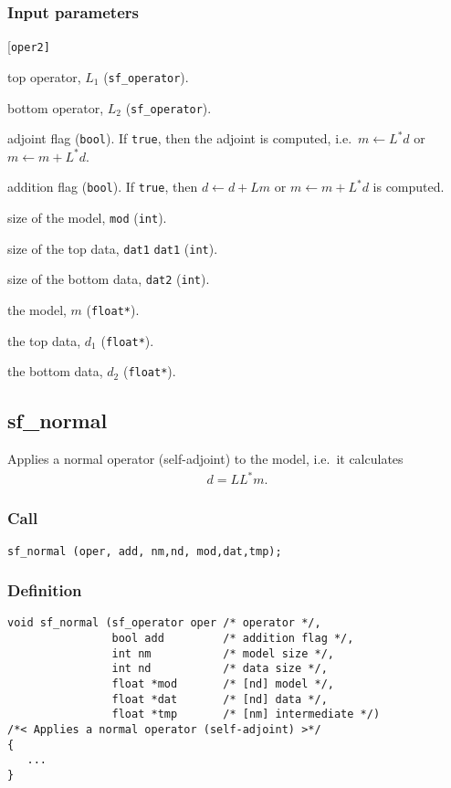\subsubsection*{Input parameters}
\begin{desclist}{\tt }{\quad}[\tt oper2]
   \setlength\itemsep{0pt}
   \item[oper1] top operator, $L_1$ (\texttt{sf\_operator}). 
   \item[oper2] bottom operator, $L_2$ (\texttt{sf\_operator}). 
   \item[adj]   adjoint flag (\texttt{bool}). If \texttt{true}, then the adjoint is computed, i.e.~$m\leftarrow L^*d$ or $m\leftarrow m + L^*d$. 
   \item[add] addition flag (\texttt{bool}). If \texttt{true}, then $d\leftarrow d + Lm$ or $m\leftarrow m + L^*d$ is computed.  
   \item[nm]    size of the model, \texttt{mod} (\texttt{int}). 
   \item[nd1]   size of the top data, \texttt{dat1} \texttt{dat1} (\texttt{int}). 
   \item[nd2]   size of the bottom data, \texttt{dat2} (\texttt{int}). 
   \item[mod]   the model, $m$ (\texttt{float*}).
   \item[dat1]  the top data, $d_1$ (\texttt{float*}).
   \item[dat2]  the bottom data, $d_2$ (\texttt{float*}).
\end{desclist}




\subsection{{sf\_normal}}
Applies a normal operator (self-adjoint) to the model, i.e.~it calculates
\begin{gather*}
	d = LL^*m.
\end{gather*}


\subsubsection*{Call}
\begin{verbatim}sf_normal (oper, add, nm,nd, mod,dat,tmp);\end{verbatim}

\subsubsection*{Definition}
\begin{verbatim}
void sf_normal (sf_operator oper /* operator */, 
                bool add         /* addition flag */, 
                int nm           /* model size */, 
                int nd           /* data size */, 
                float *mod       /* [nd] model */, 
                float *dat       /* [nd] data */, 
                float *tmp       /* [nm] intermediate */)
/*< Applies a normal operator (self-adjoint) >*/
{
   ...
}
\end{verbatim}

